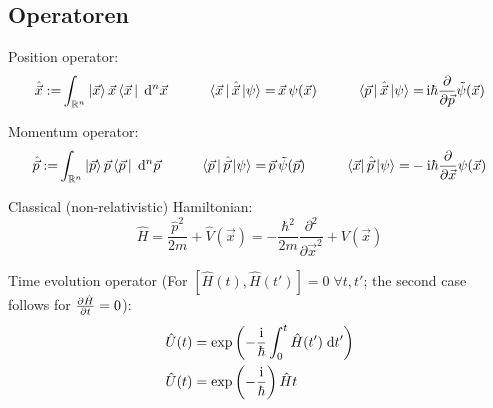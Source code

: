 	\subsection{Operatoren}
		\noindent
		Position operator:
		\begin{equation}
			\begin{aligned}
				\hat{\vec{x}} :=& \int_{\mathbb{R}^n} \Ket{\vec{x}} \vec{x} \Bra{\vec{x}\,}\;\mathrm{d}^n\vec{x} &\hspace{20pt}
				\Bra{\vec{x}\,}\hat{\vec{x}}\Ket{\psi} =& \,\vec{x}\, \psi(\vec{x}) &\hspace{20pt}
				\Bra{\vec{p}\,}\hat{\vec{x}}\Ket{\psi} =& \,\mathrm{i}\hbar\frac{\partial }{\partial \vec{p}}\tilde{\psi}(\vec{x}) \\
			\end{aligned}
		\end{equation}

		\noindent
		Momentum operator:
		\begin{equation}
			\begin{aligned}
				\hat{\vec{p}} :=& \int_{\mathbb{R}^n} \Ket{\vec{p}} \vec{p} \Bra{\vec{p}\,}\;\mathrm{d}^n\vec{p} &\hspace{20pt}
				\Bra{\vec{p}\,}\hat{\vec{p}}\Ket{\psi} =& \,\vec{p}\, \tilde{\psi}(\vec{p}) &\hspace{20pt}
				\Bra{\vec{x}}\hat{\vec{p}}\Ket{\psi} =& -\mathrm{i}\hbar\frac{\partial }{\partial \vec{x}} \psi(\vec{x}) \\
			\end{aligned}
		\end{equation}

		\noindent
		Classical (non-relativistic) Hamiltonian:
		\begin{equation}
			\hat{H} = \frac{\hat{p}^2}{2m}+\hat{V}(\vec{x}) = -\frac{\hbar^2}{2m}\frac{\partial^2}{\partial \vec{x}^2} + V(\vec{x})
		\end{equation}

		\noindent
		Time evolution operator (For $\left[\hat{H}(t),\hat{H}(t')\right] = 0\;\forall t,t'$; the second case follows for $\frac{\partial \hat{H}}{\partial t}=0$):
		\begin{equation}
			\begin{aligned}
				\hat{U}(t) &= \exp{\left(-\frac{\mathrm{i}}{\hbar}\int_0^t \hat{H}(t')\;\mathrm{d}t'\right)} \\
				\hat{U}(t) &= \exp{\left(-\frac{\mathrm{i}}{\hbar}\right)\hat{H} t} \\
			\end{aligned}
		\end{equation}

